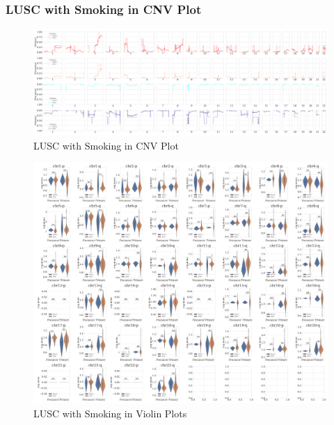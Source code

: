 \documentclass{beamer}
\begin{document}
    \begin{frame}[allowframebreaks]
        \frametitle{LUSC with Smoking in CNV Plot}

        \begin{figure}
            \includegraphics[width=\linewidth]{figures/PureCN/BWA-simple-SQC.Smoking.pdf}
            \caption{LUSC with Smoking in CNV Plot}
        \end{figure}

        \begin{figure}
            \includegraphics[width=0.7 \linewidth]{figures/PureCN/BWA-violin-SQC.Smoking.pdf}
            \caption{LUSC with Smoking in Violin Plots}
        \end{figure}
    \end{frame}
\end{document}
